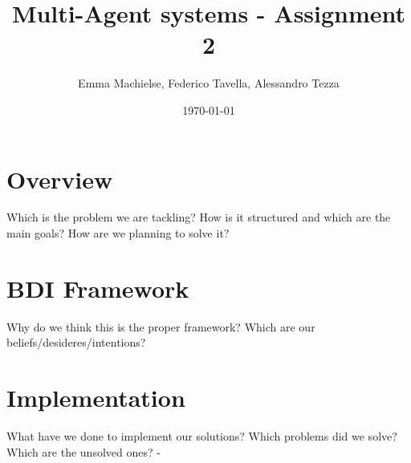 \documentclass[a4paper]{article}
\title{Multi-Agent systems - Assignment 2}
\author{Emma Machielse, Federico Tavella, Alessandro Tezza}
\date{\today}
\begin{document}
\maketitle

\section{Overview}

Which is the problem we are tackling? How is it structured and which are the main goals? How are we planning to solve it?

\section{BDI Framework}

Why do we think this is the proper framework? Which are our beliefs/desideres/intentions?

\section{Implementation}

What have we done to implement our solutions? Which problems did we solve? Which are the unsolved ones?
-
\end{document}
